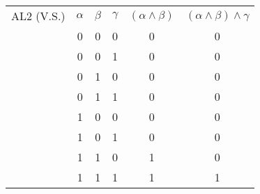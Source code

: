 \documentclass[a4paper, 12pt]{article}  %
\begin{document}
\newpage
\begin{table}[H]
    \begin{tabular}{c|c|c|c|c|c|}
        AL2 (V.S.) & $\alpha$ & $\beta$ & $\gamma$ & $(\alpha \land \beta)$ & $(\alpha \land \beta) \land \gamma $ \\
                   & 0        & 0       & 0        & 0                      & 0                                    \\
                   & 0        & 0       & 1        & 0                      & 0                                    \\
                   & 0        & 1       & 0        & 0                      & 0                                    \\
                   & 0        & 1       & 1        & 0                      & 0                                    \\
                   & 1        & 0       & 0        & 0                      & 0                                    \\
                   & 1        & 0       & 1        & 0                      & 0                                    \\
                   & 1        & 1       & 0        & 1                      & 0                                    \\
                   & 1        & 1       & 1        & 1                      & 1                                    \\
    \end{tabular}
\end{table}
\end{document}
